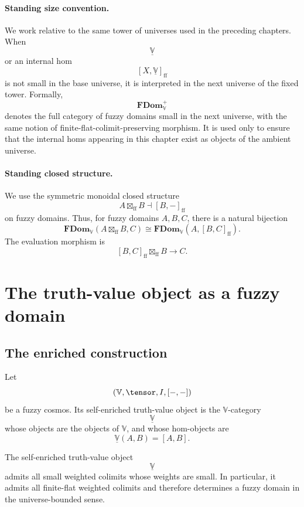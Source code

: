 \paragraph{Standing size convention.}
We work relative to the same tower of universes used in the preceding chapters.
When
\[
    \underline{\mathbb V}
\]
or an internal hom
\[
    [X,\underline{\mathbb V}]_{\mathrm{ff}}
\]
is not small in the base universe, it is interpreted in the next universe of
the fixed tower.  Formally,
\[
    \mathbf{FDom}_{\mathbb V}^{+}
\]
denotes the full category of fuzzy domains small in the next universe, with the
same notion of finite-flat-colimit-preserving morphism.  It is used only to
ensure that the internal homs appearing in this chapter exist as objects of the
ambient universe.

\paragraph{Standing closed structure.}
We use the symmetric monoidal closed structure
\[
    A\boxtimes_{\mathrm{ff}}B
    \dashv
    [B,-]_{\mathrm{ff}}
\]
on fuzzy domains.  Thus, for fuzzy domains \(A,B,C\), there is a natural
bijection
\[
    \mathbf{FDom}_{\mathbb V}
    (A\boxtimes_{\mathrm{ff}}B,C)
    \cong
    \mathbf{FDom}_{\mathbb V}
    (A,[B,C]_{\mathrm{ff}}).
\]
The evaluation morphism is
\[
    [B,C]_{\mathrm{ff}}\boxtimes_{\mathrm{ff}}B
    \longrightarrow
    C.
\]

\section{The truth-value object as a fuzzy domain}
\label{sec:truth-value-object-as-fuzzy-domain}

\subsection{The enriched construction}
\label{subsec:truth-value-domain-enriched}

Let
\[
    (\mathbb V,\tensor,I,[-,-])
\]
be a fuzzy cosmos.  Its self-enriched truth-value object is the
\(\mathbb V\)-category
\[
    \underline{\mathbb V}
\]
whose objects are the objects of \(\mathbb V\), and whose hom-objects are
\[
    \underline{\mathbb V}(A,B)=[A,B].
\]

\begin{proposition}
\label{prop:truth-value-object-fuzzy-domain}
The self-enriched truth-value object
\[
    \underline{\mathbb V}
\]
admits all small weighted colimits whose weights are small.  In particular, it
admits all finite-flat weighted colimits and therefore determines a fuzzy domain
in the universe-bounded sense.
\end{proposition}

